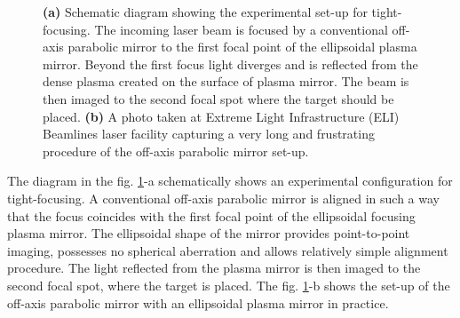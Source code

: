 \begin{figure}[h!]
	\centering
	\hspace{5mm}
	\caption{\textbf{(a)} Schematic diagram showing the experimental set-up for tight-focusing. The incoming laser beam is focused by a conventional off-axis parabolic mirror to the first focal point of the ellipsoidal plasma mirror. Beyond the first focus light diverges and is reflected from the dense plasma created on the surface of plasma mirror. The beam is then imaged to the second focal spot where the target should be placed. \textbf{(b)} A photo taken at Extreme Light Infrastructure (ELI) Beamlines laser facility capturing a very long and frustrating procedure of the off-axis parabolic mirror set-up.}
	\label{fig:9}
\end{figure}

The diagram in the fig. \ref{fig:9}-a schematically shows an experimental configuration for tight-focusing. A conventional off-axis parabolic mirror is aligned in such a way that the focus coincides with the first focal point of the ellipsoidal focusing plasma mirror. The ellipsoidal shape of the mirror provides point-to-point imaging, possesses no spherical aberration and allows relatively simple alignment procedure. The light reflected from the plasma mirror is then imaged to the second focal spot, where the target is placed. The fig. \ref{fig:9}-b shows the set-up of the off-axis parabolic mirror with an ellipsoidal plasma mirror in practice.